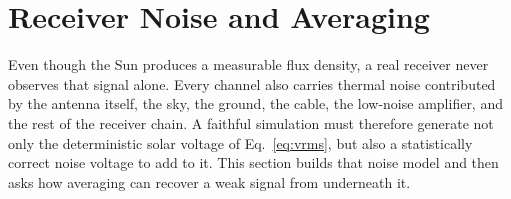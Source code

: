 \section{Receiver Noise and Averaging}
\label{sec:noise}
Even though the Sun produces a measurable flux density, a real receiver never
observes that signal alone. Every channel also carries thermal noise
contributed by the antenna itself, the sky, the ground, the cable, the
low-noise amplifier, and the rest of the receiver chain. A faithful
simulation must therefore generate not only the deterministic solar voltage of
Eq.~\eqref{eq:vrms}, but also a statistically correct noise voltage to add to
it. This section builds that noise model and then asks how averaging can
recover a weak signal from underneath it.

